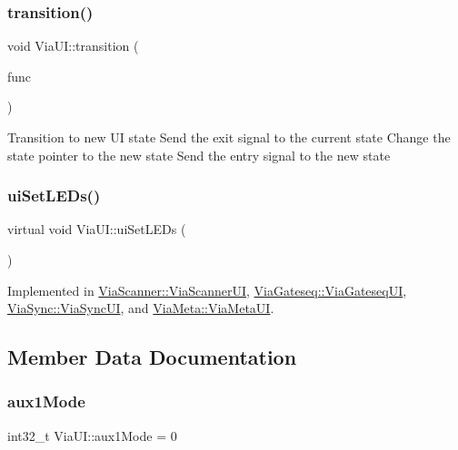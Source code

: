 \subsubsection{\texorpdfstring{transition()}{transition()}}
{\footnotesize\ttfamily void Via\+U\+I\+::transition (\begin{DoxyParamCaption}\item[{void(Via\+U\+I\+::$\ast$)(int32\+\_\+t)}]{func }\end{DoxyParamCaption})}

Transition to new UI state Send the exit signal to the current state Change the state pointer to the new state Send the entry signal to the new state \mbox{\label{class_via_u_i_a4bd3d575f4efe1273d6e4645454ead52}} 
\subsubsection{\texorpdfstring{ui\+Set\+L\+E\+Ds()}{uiSetLEDs()}}
{\footnotesize\ttfamily virtual void Via\+U\+I\+::ui\+Set\+L\+E\+Ds (\begin{DoxyParamCaption}\item[{int}]{ }\end{DoxyParamCaption})\hspace{0.3cm}{\ttfamily [pure virtual]}}



Implemented in \mbox{\hyperlink{class_via_scanner_1_1_via_scanner_u_i_aa2c3ca7904d9036eb362c7600dac66b0}{Via\+Scanner\+::\+Via\+Scanner\+UI}}, \mbox{\hyperlink{class_via_gateseq_1_1_via_gateseq_u_i_ab3eb51f8dcb036861e62c4456d726771}{Via\+Gateseq\+::\+Via\+Gateseq\+UI}}, \mbox{\hyperlink{class_via_sync_1_1_via_sync_u_i_a694877fa6ee36aa11d9fbf3e249f95e5}{Via\+Sync\+::\+Via\+Sync\+UI}}, and \mbox{\hyperlink{class_via_meta_1_1_via_meta_u_i_a54f7dbc780758a9842836a9cdd3239a0}{Via\+Meta\+::\+Via\+Meta\+UI}}.



\subsection{Member Data Documentation}
\mbox{\label{class_via_u_i_aaab0b4a294ded73b9ac59d387a94b854}} 
\subsubsection{\texorpdfstring{aux1\+Mode}{aux1Mode}}
{\footnotesize\ttfamily int32\+\_\+t Via\+U\+I\+::aux1\+Mode = 0}

